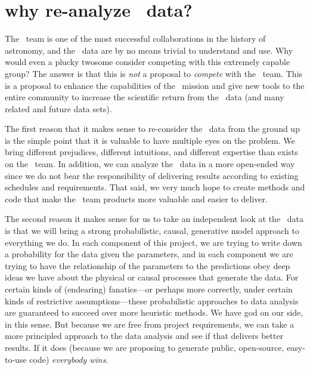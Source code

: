 \documentclass[letterpaper,12pt,preprint]{hack_aastex}
\begin{document}
\section{why re-analyze \Kepler\ data?}

The \Kepler\ team is one of the most successful collaborations in the
history of astronomy, and the \Kepler\ data are by no means trivial to
understand and use.  Why would even a plucky twosome consider
competing with this extremely capable group?  The answer is that this
is \emph{not} a proposal to \emph{compete} with the \Kepler\ team.
This is a proposal to enhance the capabilities of the \Kepler\ mission
and give new tools to the entire community to increase the scientific
return from the \Kepler\ data (and many related and future data sets).

The first reason that it makes sense to re-consider the \Kepler\ data
from the ground up is the simple point that it is valuable to have
multiple eyes on the problem.  We bring different prejudices,
different intuitions, and different expertise than exists on the
\Kepler\ team.  In addition, we can analyze the \Kepler\ data in a
more open-ended way since we do not bear the responsibility of
delivering results according to existing schedules and requirements.
That said, we very much hope to create methods and code that make the
\Kepler\ team products more valuable and easier to deliver.

The second reason it makes sense for us to take an independent look at
the \Kepler\ data is that we will bring a strong probabilistic,
causal, generative model approach to everything we do.  In each
component of this project, we are trying to write down a probability
for the data given the parameters, and in each component we are trying
to have the relationship of the parameters to the predictions obey
deep ideas we have about the physical or causal processes that
generate the data.  For certain kinds of (endearing) fanatics---or
perhaps more correctly, under certain kinds of restrictive
assumptions---these probabilistic approaches to data analysis are
guaranteed to succeed over more heuristic methods.  We have god on our
side, in this sense.  But because we are free from project
requirements, we can take a more principled approach to the data
analysis and see if that delivers better results.  If it does (because
we are proposing to generate public, open-source, easy-to-use code)
\emph{everybody wins.}
\end{document}
